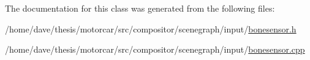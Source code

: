 The documentation for this class was generated from the following files\-:\begin{DoxyCompactItemize}
\item 
/home/dave/thesis/motorcar/src/compositor/scenegraph/input/\hyperlink{bonesensor_8h}{bonesensor.\-h}\item 
/home/dave/thesis/motorcar/src/compositor/scenegraph/input/\hyperlink{bonesensor_8cpp}{bonesensor.\-cpp}\end{DoxyCompactItemize}
